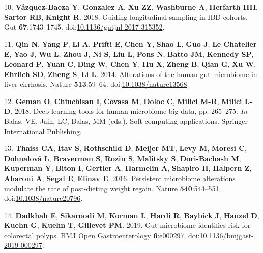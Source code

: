 \documentclass[
  11pt,
]{article}
\begin{document}
\leavevmode\hypertarget{ref-vazquez-baeza_guiding_2018}{}%
10. \textbf{Vázquez-Baeza Y}, \textbf{Gonzalez A}, \textbf{Xu ZZ},
\textbf{Washburne A}, \textbf{Herfarth HH}, \textbf{Sartor RB},
\textbf{Knight R}. 2018. Guiding longitudinal sampling in IBD cohorts.
Gut \textbf{67}:1743--1745.
doi:\href{https://doi.org/10.1136/gutjnl-2017-315352}{10.1136/gutjnl-2017-315352}.

\leavevmode\hypertarget{ref-qin_alterations_2014}{}%
11. \textbf{Qin N}, \textbf{Yang F}, \textbf{Li A}, \textbf{Prifti E},
\textbf{Chen Y}, \textbf{Shao L}, \textbf{Guo J}, \textbf{Le Chatelier
E}, \textbf{Yao J}, \textbf{Wu L}, \textbf{Zhou J}, \textbf{Ni S},
\textbf{Liu L}, \textbf{Pons N}, \textbf{Batto JM}, \textbf{Kennedy SP},
\textbf{Leonard P}, \textbf{Yuan C}, \textbf{Ding W}, \textbf{Chen Y},
\textbf{Hu X}, \textbf{Zheng B}, \textbf{Qian G}, \textbf{Xu W},
\textbf{Ehrlich SD}, \textbf{Zheng S}, \textbf{Li L}. 2014. Alterations
of the human gut microbiome in liver cirrhosis. Nature
\textbf{513}:59--64.
doi:\href{https://doi.org/10.1038/nature13568}{10.1038/nature13568}.

\leavevmode\hypertarget{ref-geman_deep_2018}{}%
12. \textbf{Geman O}, \textbf{Chiuchisan I}, \textbf{Covasa M},
\textbf{Doloc C}, \textbf{Milici M-R}, \textbf{Milici L-D}. 2018. Deep
learning tools for human microbiome big data, pp. 265--275. \emph{In}
Balas, VE, Jain, LC, Balas, MM (eds.), Soft computing applications.
Springer International Publishing.

\leavevmode\hypertarget{ref-thaiss_persistent_2016}{}%
13. \textbf{Thaiss CA}, \textbf{Itav S}, \textbf{Rothschild D},
\textbf{Meijer MT}, \textbf{Levy M}, \textbf{Moresi C},
\textbf{Dohnalová L}, \textbf{Braverman S}, \textbf{Rozin S},
\textbf{Malitsky S}, \textbf{Dori-Bachash M}, \textbf{Kuperman Y},
\textbf{Biton I}, \textbf{Gertler A}, \textbf{Harmelin A},
\textbf{Shapiro H}, \textbf{Halpern Z}, \textbf{Aharoni A},
\textbf{Segal E}, \textbf{Elinav E}. 2016. Persistent microbiome
alterations modulate the rate of post-dieting weight regain. Nature
\textbf{540}:544--551.
doi:\href{https://doi.org/10.1038/nature20796}{10.1038/nature20796}.

\leavevmode\hypertarget{ref-dadkhah_gut_2019}{}%
14. \textbf{Dadkhah E}, \textbf{Sikaroodi M}, \textbf{Korman L},
\textbf{Hardi R}, \textbf{Baybick J}, \textbf{Hanzel D}, \textbf{Kuehn
G}, \textbf{Kuehn T}, \textbf{Gillevet PM}. 2019. Gut microbiome
identifies risk for colorectal polyps. BMJ Open Gastroenterology
\textbf{6}:e000297.
doi:\href{https://doi.org/10.1136/bmjgast-2019-000297}{10.1136/bmjgast-2019-000297}.
\end{document}
